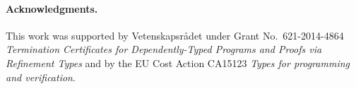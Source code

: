 \documentclass[a4paper]{easychair}
\begin{document}






\paragraph*{Acknowledgments.}
This work was supported by
Vetenskapsr\aa{}det under Grant
  No.~621-2014-4864 \emph{Termination Certificates
  for Dependently-Typed Programs and Proofs via Refinement Types}
and by the EU Cost Action CA15123 \emph{Types for programming and verification}.

\begin{footnotesize}




\end{footnotesize}
\end{document}
